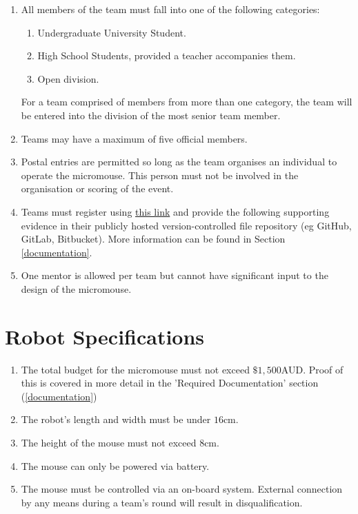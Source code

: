 \documentclass[a4paper,12pt]{article}
\begin{document}
\begin{enumerate}
    \item All members of the team must fall into one of the following categories:
    \begin{enumerate}
        \item Undergraduate University Student.
        \item High School Students, provided a teacher accompanies them.
        \item Open division. 
    \end{enumerate}
    For a team comprised of members from more than one category, the team will be entered into the division of the most senior team member.
    
    \item Teams may have a maximum of five official members.
    \item Postal entries are permitted so long as the team organises an individual to operate the micromouse. This person must not be involved in the organisation or scoring of the event.
    \item Teams must register using \href{https://docs.google.com/forms/d/e/1FAIpQLSfgJvkqMc7n0ZsVmL9k6BHqfp1Mh1eJzLbrlLD1zvHRQLh8Dg/viewform?usp=sf_link}{this link} and provide the following supporting evidence in their publicly hosted version-controlled file repository (eg GitHub, GitLab, Bitbucket). More information can be found in Section \ref{documentation}.
    \item One mentor is allowed per team but cannot have significant input to the design of the micromouse.
\end{enumerate}

\section{Robot Specifications}


\begin{enumerate}
    \item The total budget for the micromouse must not exceed $\$1,500$AUD. Proof of this is covered in more detail in the 'Required Documentation' section (\ref{documentation})
    \item The robot's length and width must be under $16$cm.
    \item The height of the mouse must not exceed $8$cm.
    \item The mouse can only be powered via battery.
    \item The mouse must be controlled via an on-board system. External connection by any means during a team's round will result in disqualification.
\end{enumerate}
\end{document}
